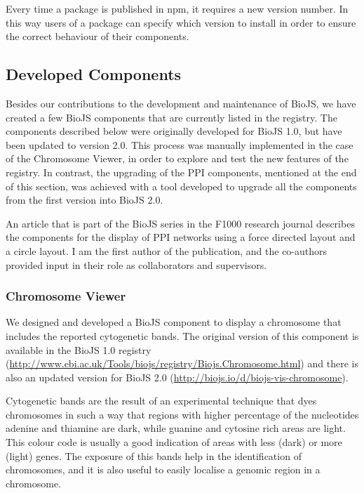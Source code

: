Every time a package is published in npm, it requires a new version number. In this way users of a package can specify which version to install in order to ensure the correct behaviour of their components.



\subsection{Developed Components} \label{subsec:biojs_components}
Besides our contributions to the development and maintenance of BioJS, we have created a few BioJS components that are currently listed in the registry. The components described below were originally developed for BioJS 1.0, but have been updated to version 2.0. This process was manually implemented in the case of the Chromosome Viewer, in order to explore and test the new features of the registry. In contrast, the upgrading of the PPI components, mentioned at the end of this section, was achieved with a tool developed to upgrade all the components from the first version into BioJS 2.0.

An article that is part of the BioJS series in the F1000 research journal describes the components for the display of PPI networks using a force directed layout and a circle layout. I am the first author of the publication, and the co-authors provided input in their role as collaborators and supervisors.

\subsubsection{Chromosome Viewer}
We designed and developed a BioJS component to display a chromosome that includes the reported cytogenetic bands. The original version of this component is available in the BioJS 1.0 registry (\url{http://www.ebi.ac.uk/Tools/biojs/registry/Biojs.Chromosome.html}) and there is also an updated version for  BioJS 2.0 (\url{http://biojs.io/d/biojs-vis-chromosome}).

Cytogenetic bands are the result of an experimental technique that dyes chromosomes in such a way that regions with higher percentage of the nucleotides adenine and thiamine are dark, while guanine and cytosine rich areas are light. This colour code is usually a good indication of areas with less (dark) or more (light) genes. The exposure of this bands help in the identification of chromosomes, and it is also useful to easily localise a genomic region in a chromosome.

